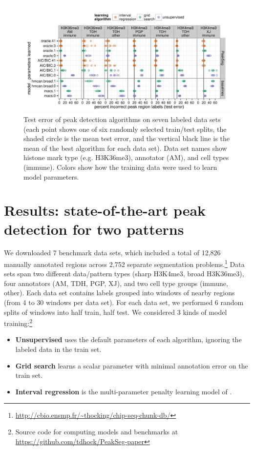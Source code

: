 \documentclass{article}
\begin{document}
\begin{figure}[b!]
  \centering
  \includegraphics[width=\textwidth]{figure-dp-peaks-regression-dots}
  \vskip -0.5cm
  \caption{Test error of peak detection algorithms on seven labeled
    data sets (each point shows one of six randomly selected
    train/test splits, the shaded circle is the mean test error, and
    the vertical black line is the mean of the best algorithm for each
    data set). Data set names show histone mark type (e.g. H3K36me3),
    annotator (AM), and cell types (immune). Colors show how the
    training data were used to learn model parameters.}
  \label{fig:test-error}
\end{figure}

\section{Results: state-of-the-art peak detection
  for two patterns}
\label{sec:results}

We downloaded 7 benchmark data sets, which included a total of 12,826
manually annotated regions across 2,752 separate segmentation
problems.\footnote{\url{http://cbio.ensmp.fr/~thocking/chip-seq-chunk-db/}}
Data sets span two different data/pattern types (sharp H3K4me3, broad
H3K36me3), four annotators (AM, TDH, PGP, XJ), and two cell type
groups (immune, other). Each data set contains labels grouped into
windows of nearby regions (from 4 to 30 windows per data set). For
each data set, we performed 6 random splits of windows into half
train, half test.  We
considered 3 kinds of model training:\footnote{Source code for computing models and benchmarks at\\
  \url{https://github.com/tdhock/PeakSeg-paper} }
\begin{itemize}
\item \textbf{Unsupervised} uses the default parameters of each
  algorithm, ignoring the labeled data in the train set.
\item \textbf{Grid search} learns a scalar parameter with minimal
  annotation error on the train set.
\item \textbf{Interval regression} is the multi-parameter
  penalty learning model of \citet{HOCKING-penalties}.
\end{itemize}
\end{document}
